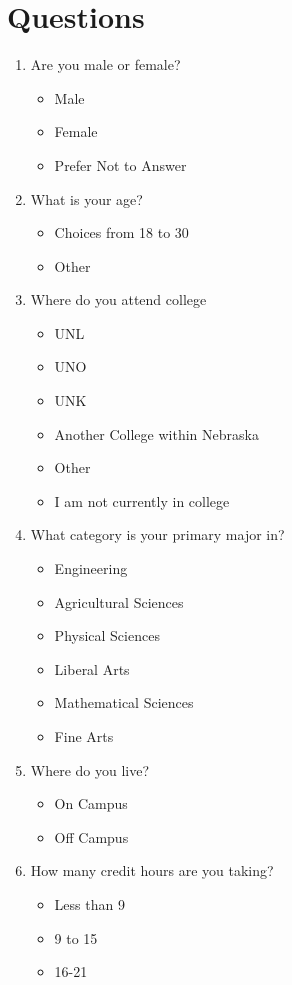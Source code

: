 \documentclass[10pt,twocolumn]{article}
\author{Samuel W. Flint}
\date{\today}
\title{}
\begin{document}
\section*{Questions}
\label{sec:orgc05c7b4}

\begin{enumerate}
\item Are you male or female?
\begin{itemize}
\item Male
\item Female
\item Prefer Not to Answer
\end{itemize}
\item What is your age?
\begin{itemize}
\item Choices from 18 to 30
\item Other
\end{itemize}
\item Where do you attend college
\begin{itemize}
\item UNL
\item UNO
\item UNK
\item Another College within Nebraska
\item Other
\item I am not currently in college
\end{itemize}
\item What category is your primary major in?
\begin{itemize}
\item Engineering
\item Agricultural Sciences
\item Physical Sciences
\item Liberal Arts
\item Mathematical Sciences
\item Fine Arts
\end{itemize}
\item Where do you live?
\begin{itemize}
\item On Campus
\item Off Campus
\end{itemize}
\item How many credit hours are you taking?
\begin{itemize}
\item Less than 9
\item 9 to 15
\item 16-21

\end{itemize}
\end{enumerate}
\end{document}
